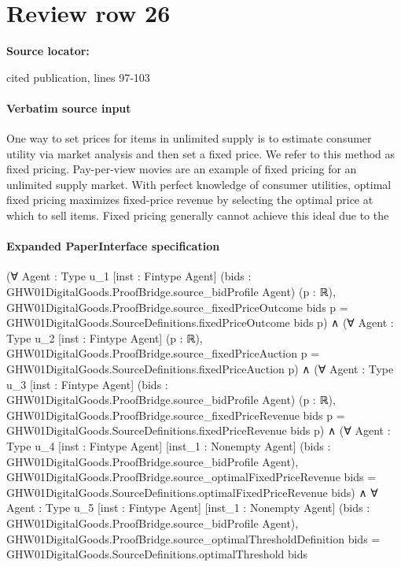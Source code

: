 \documentclass[10pt]{article}
\begin{document}
\section*{Review row 26}
\textbf{Source locator:} {\footnotesize\raggedright cited publication, lines 97-\allowbreak{}103\par}
\paragraph{Verbatim source input}
\begin{ReviewVerbatim}
One way to set prices for items in unlimited supply
is to estimate consumer utility via market analysis
and then set a fixed price. We refer to this method
as fixed pricing. Pay-per-view movies are an example of fixed pricing for an unlimited supply market.
With perfect knowledge of consumer utilities, optimal
fixed pricing maximizes fixed-price revenue by selecting the optimal price at which to sell items. Fixed
pricing generally cannot achieve this ideal due to the
\end{ReviewVerbatim}


\paragraph{Expanded PaperInterface specification}
\begin{ReviewVerbatim}
(∀ {Agent : Type u_1} [inst : Fintype Agent] (bids : GHW01DigitalGoods.ProofBridge.source_bidProfile Agent) (p : ℝ),
    GHW01DigitalGoods.ProofBridge.source_fixedPriceOutcome bids p =
      GHW01DigitalGoods.SourceDefinitions.fixedPriceOutcome bids p) ∧
  (∀ {Agent : Type u_2} [inst : Fintype Agent] (p : ℝ),
      GHW01DigitalGoods.ProofBridge.source_fixedPriceAuction p =
        GHW01DigitalGoods.SourceDefinitions.fixedPriceAuction p) ∧
    (∀ {Agent : Type u_3} [inst : Fintype Agent] (bids : GHW01DigitalGoods.ProofBridge.source_bidProfile Agent) (p : ℝ),
        GHW01DigitalGoods.ProofBridge.source_fixedPriceRevenue bids p =
          GHW01DigitalGoods.SourceDefinitions.fixedPriceRevenue bids p) ∧
      (∀ {Agent : Type u_4} [inst : Fintype Agent] [inst_1 : Nonempty Agent]
          (bids : GHW01DigitalGoods.ProofBridge.source_bidProfile Agent),
          GHW01DigitalGoods.ProofBridge.source_optimalFixedPriceRevenue bids =
            GHW01DigitalGoods.SourceDefinitions.optimalFixedPriceRevenue bids) ∧
        ∀ {Agent : Type u_5} [inst : Fintype Agent] [inst_1 : Nonempty Agent]
          (bids : GHW01DigitalGoods.ProofBridge.source_bidProfile Agent),
          GHW01DigitalGoods.ProofBridge.source_optimalThresholdDefinition bids =
            GHW01DigitalGoods.SourceDefinitions.optimalThreshold bids
\end{ReviewVerbatim}
\end{document}
